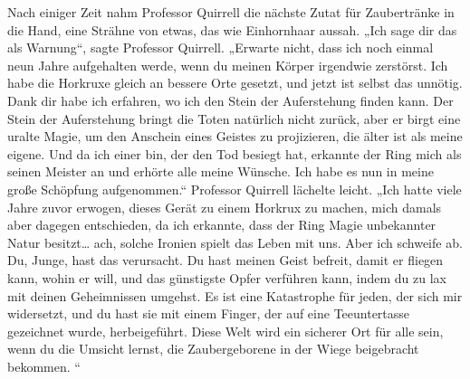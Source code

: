 Nach einiger Zeit nahm Professor Quirrell die nächste Zutat für Zaubertränke in die Hand, eine Strähne von etwas, das wie Einhornhaar aussah.
„Ich sage dir das als Warnung“, sagte Professor Quirrell. „Erwarte nicht, dass ich noch einmal neun Jahre aufgehalten werde, wenn du meinen Körper irgendwie zerstörst. Ich habe die Horkruxe gleich an bessere Orte gesetzt, und jetzt ist selbst das unnötig. Dank dir habe ich erfahren, wo ich den Stein der Auferstehung finden kann. Der Stein der Auferstehung bringt die Toten natürlich nicht zurück, aber er birgt eine uralte Magie, um den Anschein eines Geistes zu projizieren, die älter ist als meine eigene. Und da ich einer bin, der den Tod besiegt hat, erkannte der Ring mich als seinen Meister an und erhörte alle meine Wünsche. Ich habe es nun in meine große Schöpfung aufgenommen.“
Professor Quirrell lächelte leicht.
„Ich hatte viele Jahre zuvor erwogen, dieses Gerät zu einem Horkrux zu machen, mich damals aber dagegen entschieden, da ich erkannte, dass der Ring Magie unbekannter Natur besitzt… ach, solche Ironien spielt das Leben mit uns. Aber ich schweife ab. Du, Junge, hast das verursacht. Du hast meinen Geist befreit, damit er fliegen kann, wohin er will, und das günstigste Opfer verführen kann, indem du zu lax mit deinen Geheimnissen umgehst. Es ist eine Katastrophe für jeden, der sich mir widersetzt, und du hast sie mit einem Finger, der auf eine Teeuntertasse gezeichnet wurde, herbeigeführt. Diese Welt wird ein sicherer Ort für alle sein, wenn du die Umsicht lernst, die Zaubergeborene in der Wiege beigebracht bekommen. “


